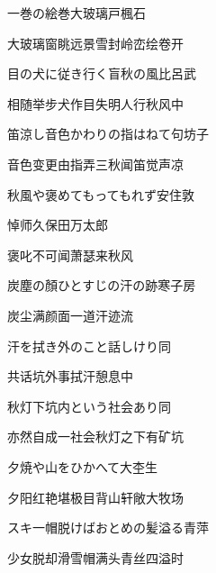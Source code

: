 \begin{haiku}
    {\FH 一巻の絵巻大玻璃戸}\hfill{\FH 楓石}

    {\FK 大玻璃窗眺远景雪封岭峦绘卷开}
\end{haiku}

\begin{haiku}
    {\FH 目の犬に従き行く盲秋の風}\hfill{\FH 比呂武}

    {\FK 相随举步犬作目失明人行秋风中}
\end{haiku}

\begin{haiku}
    {\FH 笛涼し音色かわりの指はねて}\hfill{\FH 句坊子}

    {\FK 音色变更由指弄三秋闻笛觉声凉}
\end{haiku}

\begin{haiku}
    {\FH 秋風や褒めてもってもれず}\hfill{\FH 安住敦}

    {\FK 悼师久保田万太郎}

    {\FK 褒叱不可闻萧瑟来秋风}
\end{haiku}

\begin{haiku}
    {\FH 炭塵の顏ひとすじの汗の跡}\hfill{\FH 寒子房}

    {\FK 炭尘满颜面一道汗迹流}
\end{haiku}

\begin{haiku}
    {\FH 汗を拭き外のこと話しけり}\hfill{\FH 同}

    {\FK 共话坑外事拭汗憩息中}
\end{haiku}

\begin{haiku}
    {\FH 秋灯下坑内という社会あり}\hfill{\FH 同}

    {\FK 亦然自成一社会秋灯之下有矿坑}
\end{haiku}

\begin{haiku}
    {\FH 夕焼や山をひかへて大}\hfill{\FH 杢生}

    {\FK 夕阳红艳堪极目背山轩敞大牧场}
\end{haiku}

\begin{haiku}
    {\FH スキ一帽脱けばおとめの髪溢る}\hfill{\FH 青萍}

    {\FK 少女脱却滑雪帽满头青丝四溢时}
\end{haiku}

